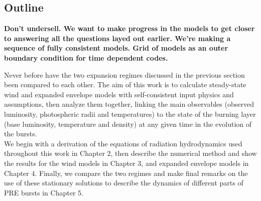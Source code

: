 \documentclass[../main.tex]{subfiles}
\begin{document}
\subsection{Outline}

\textbf{Don't undersell. We want to make progress in the models to get closer to answering all the questions layed out earlier. We're making a sequence of fully consistent models. Grid of models as an outer boundary condition for time dependent codes. }

Never before have the two expansion  regimes discussed in the previous section been compared to each other. The aim of this work is to calculate steady-state wind and expanded envelope models with self-consistent input physics and assumptions, then analyze them together, linking the main observables (observed luminosity, photospheric radii and temperatures) to the state of the burning layer (base luminosity, temperature and density) at any given time in the evolution of the bursts.\\

We begin with a derivation of the equations of radiation hydrodynamics used throughout this work in Chapter 2, then describe the numerical method and show the results for the wind models in Chapter 3, and expanded envelope models in Chapter 4. Finally, we compare the two regimes and make final remarks on the use of these stationary solutions to describe the dynamics of different parts of PRE bursts in Chapter 5.

\biblio
\end{document}
